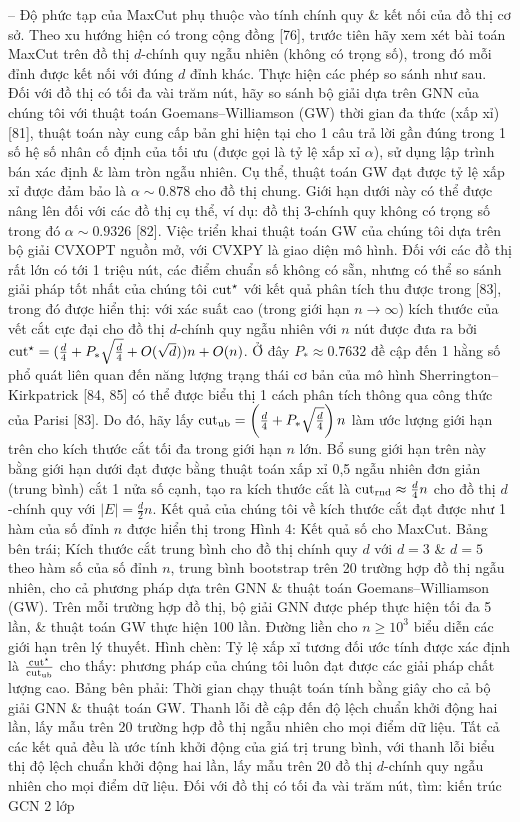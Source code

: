 \documentclass{article}
\begin{document}
\begin{itemize}
    -- Độ phức tạp của MaxCut phụ thuộc vào tính chính quy \& kết nối của đồ thị cơ sở. Theo xu hướng hiện có trong cộng đồng [76], trước tiên hãy xem xét bài toán MaxCut trên đồ thị $d$-chính quy ngẫu nhiên (không có trọng số), trong đó mỗi đỉnh được kết nối với đúng $d$ đỉnh khác. Thực hiện các phép so sánh như sau. Đối với đồ thị có tối đa vài trăm nút, hãy so sánh bộ giải dựa trên GNN của chúng tôi với thuật toán Goemans--Williamson (GW) thời gian đa thức (xấp xỉ) [81], thuật toán này cung cấp bản ghi hiện tại cho 1 câu trả lời gần đúng trong 1 số hệ số nhân cố định của tối ưu (được gọi là tỷ lệ xấp xỉ $\alpha$), sử dụng lập trình bán xác định \& làm tròn ngẫu nhiên. Cụ thể, thuật toán GW đạt được tỷ lệ xấp xỉ được đảm bảo là $\alpha\sim0.878$ cho đồ thị chung. Giới hạn dưới này có thể được nâng lên đối với các đồ thị cụ thể, ví dụ: đồ thị 3-chính quy không có trọng số trong đó $\alpha\sim0.9326$ [82]. Việc triển khai thuật toán GW của chúng tôi dựa trên bộ giải CVXOPT nguồn mở, với CVXPY là giao diện mô hình. Đối với các đồ thị rất lớn có tới 1 triệu nút, các điểm chuẩn số không có sẵn, nhưng có thể so sánh giải pháp tốt nhất của chúng tôi ${\rm cut}^\star$ với kết quả phân tích thu được trong [83], trong đó được hiển thị: với xác suất cao (trong giới hạn $n\to\infty$) kích thước của vết cắt cực đại cho đồ thị $d$-chính quy ngẫu nhiên với $n$ nút được đưa ra bởi ${\rm cut}^\star = (\frac{d}{4} + P_*\sqrt{\frac{d}{4}} + O(\sqrt{d}))n + O(n)$. Ở đây $P_*\approx0.7632$ đề cập đến 1 hằng số phổ quát liên quan đến năng lượng trạng thái cơ bản của mô hình Sherrington--Kirkpatrick [84, 85] có thể được biểu thị 1 cách phân tích thông qua công thức của Parisi [83]. Do đó, hãy lấy ${\rm cut}_{\rm ub} = \left(\frac{d}{4} + P_*\sqrt{\frac{d}{4}}\right)n$ làm ước lượng giới hạn trên cho kích thước cắt tối đa trong giới hạn $n$ lớn. Bổ sung giới hạn trên này bằng giới hạn dưới đạt được bằng thuật toán xấp xỉ 0,5 ngẫu nhiên đơn giản (trung bình) cắt 1 nửa số cạnh, tạo ra kích thước cắt là ${\rm cut}_{\rm rnd}\approx\frac{d}{4}n$ cho đồ thị $d$-chính quy với $|E| = \frac{d}{2}n$. Kết quả của chúng tôi về kích thước cắt đạt được như 1 hàm của số đỉnh $n$ được hiển thị trong {\sf Hình 4: Kết quả số cho MaxCut. Bảng bên trái; Kích thước cắt trung bình cho đồ thị chính quy $d$ với $d = 3$ \& $d = 5$ theo hàm số của số đỉnh $n$, trung bình bootstrap trên 20 trường hợp đồ thị ngẫu nhiên, cho cả phương pháp dựa trên GNN \& thuật toán Goemans--Williamson (GW). Trên mỗi trường hợp đồ thị, bộ giải GNN được phép thực hiện tối đa 5 lần, \& thuật toán GW thực hiện 100 lần. Đường liền cho $n\ge10^3$ biểu diễn các giới hạn trên lý thuyết. Hình chèn: Tỷ lệ xấp xỉ tương đối ước tính được xác định là $\frac{{\rm cut}^\star}{{\rm cut}_{\rm ub}}$ cho thấy: phương pháp của chúng tôi luôn đạt được các giải pháp chất lượng cao. Bảng bên phải: Thời gian chạy thuật toán tính bằng giây cho cả bộ giải GNN \& thuật toán GW. Thanh lỗi đề cập đến độ lệch chuẩn khởi động hai lần, lấy mẫu trên 20 trường hợp đồ thị ngẫu nhiên cho mọi điểm dữ liệu.} Tất cả các kết quả đều là ước tính khởi động của giá trị trung bình, với thanh lỗi biểu thị độ lệch chuẩn khởi động hai lần, lấy mẫu trên 20 đồ thị $d$-chính quy ngẫu nhiên cho mọi điểm dữ liệu. Đối với đồ thị có tối đa vài trăm nút, tìm: kiến trúc GCN 2 lớp 
\end{itemize}
\end{document}
